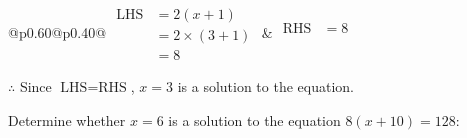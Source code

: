 \documentclass[12pt]{article}
\newcounter{minipagecount}
\begin{document}
\begin{multicols}{2}
\begin{minipage}[t]{0.40\textwidth}
    \renewcommand{\arraystretch}{1.3} %
    \begin{tabular}{@{}p{0.60\linewidth}@{}p{0.40\linewidth}@{}}
        \(\begin{aligned}
            \text{LHS} &= 2(x + 1) \\
                    &= 2 \times(3 + 1) \\
                    &= 8
        \end{aligned}\) &
        \(\begin{aligned}
            \text{RHS} &= 8\\
                    & \\
                    &
        \end{aligned}\)
    \end{tabular}
    \renewcommand{\arraystretch}{1.0} %
    \vspace{2pt}  %

    \noindent \(\therefore\) Since \(\text{LHS} = \text{RHS}\), \(x = 3\) is  a solution to the equation.

\end{minipage}

 \vspace*{16pt}
\noindent{(\theminipagecount)}\hspace{0.1mm} %
\begin{minipage}[t]{0.40\textwidth} %

    \noindent Determine whether \(x = 6\) is a solution to the equation \(8(x + 10) = 128\):
    \vspace{4pt}  %

    \noindent


\end{minipage}
\end{multicols}
\end{document}
